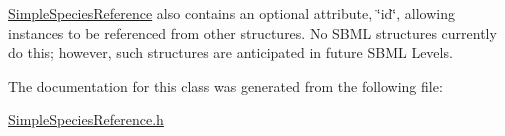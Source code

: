 \hyperlink{class_simple_species_reference}{Simple\+Species\+Reference} also contains an optional attribute, \char`\"{}id\char`\"{}, allowing instances to be referenced from other structures. No S\+B\+ML structures currently do this; however, such structures are anticipated in future S\+B\+ML Levels. 

The documentation for this class was generated from the following file\+:\begin{DoxyCompactItemize}
\item 
\hyperlink{_simple_species_reference_8h}{Simple\+Species\+Reference.\+h}\end{DoxyCompactItemize}
